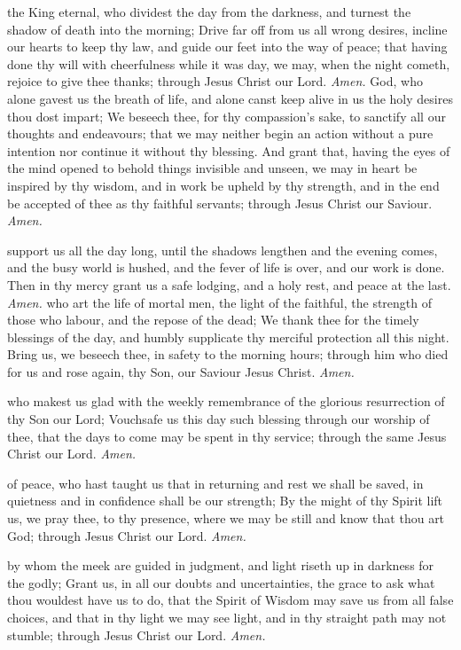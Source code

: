  the King eternal, who dividest the day from the darkness, and turnest the shadow of death into the morning; Drive far off from us all wrong desires, incline our hearts to keep thy law, and guide our feet into the way of peace; that having done thy will with cheerfulness while it was day, we may, when the night cometh, rejoice to give thee thanks; through Jesus Christ our Lord. \textit{Amen.}
 God, who alone gavest us the breath of life, and alone canst keep alive in us the holy desires thou dost impart; We beseech thee, for thy compassion's sake, to sanctify all our thoughts and endeavours; that we may neither begin an action without a pure intention nor continue it without thy blessing. And grant that, having the eyes of the mind opened to behold things invisible and unseen, we may in heart be inspired by thy wisdom, and in work be upheld by thy strength, and in the end be accepted of thee as thy faithful servants; through Jesus Christ our Saviour. \textit{Amen.}

 support us all the day long, until the shadows lengthen and the evening comes, and the busy world is hushed, and the fever of life is over, and our work is done. Then in thy mercy grant us a safe lodging, and a holy rest, and peace at the last. \textit{Amen.}
 who art the life of mortal men, the light of the faithful, the strength of those who labour, and the repose of the dead; We thank thee for the timely blessings of the day, and humbly supplicate thy merciful protection all this night. Bring us, we beseech thee, in safety to the morning hours; through him who died for us and rose again, thy Son, our Saviour Jesus Christ. \textit{Amen.}

 who makest us glad with the weekly remembrance of the glorious resurrection of thy Son our Lord; Vouchsafe us this day such blessing through our worship of thee, that the days to come may be spent in thy service; through the same Jesus Christ our Lord. \textit{Amen.}

 of peace, who hast taught us that in returning and rest we shall be saved, in quietness and in confidence shall be our strength; By the might of thy Spirit lift us, we pray thee, to thy presence, where we may be still and know that thou art God; through Jesus Christ our Lord. \textit{Amen.}

 by whom the meek are guided in judgment, and light riseth up in darkness for the godly; Grant us, in all our doubts and uncertainties, the grace to ask what thou wouldest have us to do, that the Spirit of Wisdom may save us from all false choices, and that in thy light we may see light, and in thy straight path may not stumble; through Jesus Christ our Lord. \textit{Amen.}

